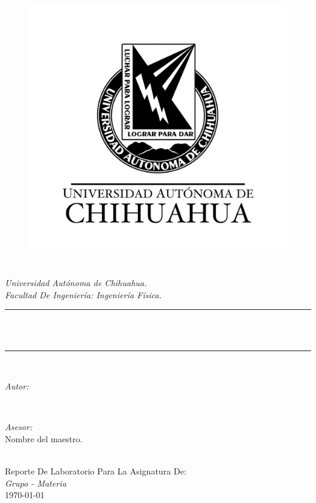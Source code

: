 \documentclass[12pt]{article}
\begin{document}
\begin{titlepage}
	\newcommand{\HRule}{\rule{\linewidth}{0.5mm}}
	\begin{figure}
		\centering
		\includegraphics{escudo-texto-bn.png}
	\end{figure}
	\centering 
	\quad\\[1.5cm]
	\textsl{\Large Universidad Autónoma de Chihuahua.}\\[0.5cm] 
	\textsl{\large Facultad De Ingeniería: Ingeniería Física.}\\[0.5cm] 
	\makeatletter
	\HRule \\[0.4cm]
	{ \huge \bfseries \@title}\\[0.4cm] 
	\HRule \\[1.5cm]
	\begin{minipage}{0.4\textwidth}
		\begin{flushleft} \large
			\emph{Autor:}\\
			\@author 
		\end{flushleft}
	\end{minipage}
	~
	\begin{minipage}{0.4\textwidth}
		\begin{flushright} \large
			\emph{Asesor:} \\
			\textup{Nombre del maestro.}
		\end{flushright}
	\end{minipage}\\[3cm]
	\makeatother
	{\large Reporte De Laboratorio Para La Asignatura De:}\\[0.5cm]
	{\large \emph{Grupo - Materia}}\\[0.5cm]
	{\large \today}\\[2cm] 
	\vfill 
\end{titlepage}
 
\end{document}
